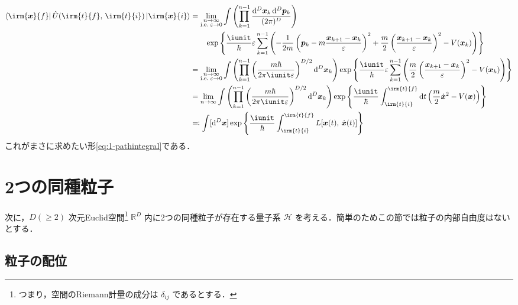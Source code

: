 \documentclass[TQFT_main]{subfiles}
\begin{document}
\begin{align}
    \bra{\irm{\bm{x}}{f}} \hat{U}(\irm{t}{f},\, \irm{t}{i}) \ket{\irm{\bm{x}}{i}} 
    &= \lim_{\substack{n\to \infty \\ \mathrm{i.e.}\; \varepsilon \to 0}}\int \left(\prod_{k=1}^{n-1}  \frac{\dd[D]{\bm{x}_k}\dd^D \bm{p}_k}{(2\pi)^D} \right) \\
    &\qquad \exp\left\{ \frac{\iunit}{\hbar} \varepsilon \sum_{k=1}^{n-1} \left(- \frac{1}{2m} \left( \bm{p}_k - m\frac{\bm{x}_{k+1} - \bm{x}_k}{\varepsilon} \right)^2 + \frac{m}{2} \left( \frac{\bm{x}_{k+1} - \bm{x}_k}{\varepsilon} \right)^2 - V(\bm{x}_k) \right)  \right\} \\ 
    &= \lim_{\substack{n\to \infty \\ \mathrm{i.e.}\; \varepsilon \to 0}}\int \left(\prod_{k=1}^{n-1}  \left(\frac{m\hbar}{2\pi \iunit \varepsilon}\right)^{D/2} \dd[D]{\bm{x}_k} \right) \exp\left\{ \frac{\iunit}{\hbar} \varepsilon \sum_{k=1}^{n-1} \left(\frac{m}{2} \left( \frac{\bm{x}_{k+1} - \bm{x}_k}{\varepsilon} \right)^2 - V(\bm{x}_k) \right)  \right\} \\
    &= \lim_{n\to \infty}\int \left(\prod_{k=1}^{n-1}  \left(\frac{m\hbar}{2\pi \iunit \varepsilon}\right)^{D/2} \dd[D]{\bm{x}_k} \right) \exp\left\{ \frac{\iunit}{\hbar} \int_{\irm{t}{i}}^{\irm{t}{f}} \dd{t} \left(\frac{m}{2} \dot{\bm{x}}^2 - V(\bm{x}) \right)  \right\} \\
    &\eqqcolon \int [\dd[D]{\bm{x}}] \exp \left\{ \frac{\iunit}{\hbar} \int_{\irm{t}{i}}^{\irm{t}{f}} L [\bm{x}(t),\, \dot{\bm{x}} (t)] \right\} 
\end{align}
これがまさに求めたい形\eqref{eq:1-pathintegral}である．

\section{2つの同種粒子}

次に，$D (\ge 2)$ 次元Euclid空間\footnote{つまり，空間のRiemann計量の成分は $\delta_{ij}$ であるとする．} $\mathbb{R}^D$ 内に2つの同種粒子が存在する量子系 $\mathcal{H}$ を考える．簡単のためこの節では粒子の内部自由度はないとする．

\subsection{粒子の配位}
\end{document}

